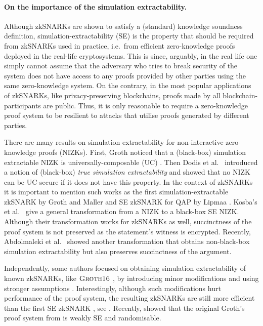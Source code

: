 \let\accentvec\vec \documentclass[runningheads,10pt]{llncs}
\begin{document}
\paragraph{On the importance of the simulation extractability.}
Although zkSNARKs are shown to satisfy a (standard) knowledge soundness definition,
simulation-extractability (SE) is the property that should be required from
zkSNARKs used in practice, i.e.~from efficient zero-knowledge proofs deployed in
the real-life cryptosystems. This is since, arguably, in the real life one simply cannot
assume that the adversary who tries to break security of the system does not
have access to any proofs provided by other parties using the same
zero-knowledge system. On the contrary, in the most popular applications of
zkSNARKs, like privacy-preserving blockchains, proofs made by all
blockchain-participants are public. Thus, it is only reasonable to require 
a zero-knowledge proof system to be resilient to attacks that utilise proofs
generated by different parties.

There are many results on simulation extractability for
non-interactive zero-knowledge proofs (NIZKs). First, Groth \cite{AC:Groth07}
noticed that a (black-box) simulation extractable NIZK is
universally-composable (UC) 
\cite{EPRINT:Canetti00}. Then Dodis et al.~\cite{AC:DHLW10} introduced a
notion of (black-box) \emph{true simulation extractability} and showed that no
NIZK can be UC-secure if it does not have this property. 
In the context of zkSNARKs it is important to mention such works as the first
simulation-extractable zkSNARK by Groth and Maller \cite{C:GroMal17} and SE
zkSNARK for QAP by Lipmaa \cite{EPRINT:Lipmaa19a}. 
Kosba's et
al.~\cite{EPRINT:KZMQCP15} give a general transformation from a NIZK to a
black-box SE NIZK. Although their transformation works for zkSNARKs as well,
succinctness of the proof system is not preserved as the statement's witness is encrypted.
Recently, Abdolmaleki et al.~\cite{CCS:AbdRamSla20} showed another transformation that
obtains non-black-box simulation extractability but also preserves
succinctness of the argument.

Independently, some authors focused on obtaining simulation extractability of
known zkSNARKs, like $\textsc{Groth16}$ \cite{EC:Groth16}, by introducing minor modifications and using
stronger assumptions \cite{EPRINT:BowGab18,EPRINT:AtaBag19}. Interestingly,
although such modifications hurt performance of the proof system, the resulting
zkSNARKs are still more efficient than the first SE zkSNARK \cite{C:GroMal17},
see \cite{EPRINT:AtaBag19}. Recently, \cite{EPRINT:BKSV20} showed that the
original Groth's proof system from \cite{EC:Groth16} is weakly SE and
randomisable.  
\end{document}
